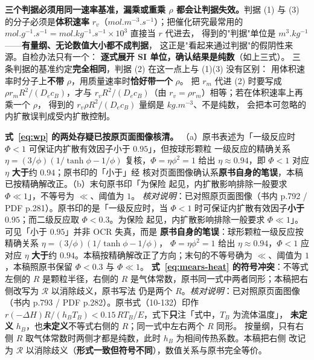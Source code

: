 \begin{pitfall}
\textbf{三个判据必须用同一速率基准，漏乘或重乘 $\rho$ 都会让判据失效。}判据 (1) 与 (3)
的分子必须是\textbf{体积速率} $r_v$（$\unit{mol.m^{-3}.s^{-1}}$）；把催化研究最常用的
$\unit{mol.g^{-1}.s^{-1}}=\unit{mol.kg^{-1}.s^{-1}}\times10^{3}$ 直接当 $r$ 代进去，
得到的"判据"单位是 $\unit{m^3.kg^{-1}}$——\textbf{有量纲、无论数值大小都不成判据}，
这正是"看起来通过判据"的假阴性来源。自检办法只有一个：
\textbf{逐式展开 SI 单位，确认结果是纯数}（如上三式）。
三条判据的基准约定\textbf{完全相同}，判据 (2) 在这一点上与 (1)(3) 没有区别：
用体积速率时分子上\textbf{不带} $\rho$，用质量速率时\textbf{恰好带一个} $\rho$。
把 $r_m$ 代进 (2) 时要写成 $\rho r_mR^{2}/(D_ec_B)$，才与
$r_vR^{2}/(D_ec_B)$（由 $r_v=\rho r_m$）相等；若在体积速率上再乘一个 $\rho$，
得到的 $r_v\rho R^{2}/(D_ec_B)$ 量纲是 $\unit{kg.m^{-3}}$、不是纯数，
会把本可忽略的内扩散误判成受内扩散控制。

\textbf{式~\eqref{eq:wp} 的两处存疑已按原页面图像核清。}
（a）原书表述为「一级反应时 $\Phi<1$ 可保证内扩散有效因子小于 $0.95$」，但按球形颗粒
一级反应的精确关系 $\eta=(3/\phi)(1/\tanh\phi-1/\phi)$ 复核，$\Phi=\eta\phi^{2}=1$ 给出
$\eta\approx 0.94$，即 $\Phi<1$ 对应 $\eta$ \textbf{大于}约 $0.94$；原书印的「小于」经
核对页面图像确认系\textbf{原书自身的笔误}，本稿已按精确解改正。（b）末句原书印「为保险
起见，内扩散影响排除一般要求 $\Phi\ll1$」，不等号为 $\ll$、阈值为 $1$。
\emph{核对说明}：已对照原页面图像（书内 p.792 / PDF p.281）。原书印的是「一级反应时，当
$\Phi<1$ 时可保证内扩散有效因子\textbf{小于} $0.95$；而二级反应取 $\Phi<0.3$。为保险
起见，内扩散影响排除一般要求 $\Phi\ll1$」。可见「小于 $0.95$」并非 OCR 失真，而是
\textbf{原书自身的笔误}：球形颗粒一级反应按精确关系 $\eta=(3/\phi)(1/\tanh\phi-1/\phi)$，
$\Phi=\eta\phi^{2}=1$ 给出 $\eta\approx0.94$，$\Phi<1$ 应对应 $\eta$ \textbf{大于}约
$0.94$。本稿按精确解改正了方向；末句的不等号确为 $\ll$、阈值为 $1$，本稿照原书保留
$\Phi<0.3$ 与 $\Phi\ll1$。
\textbf{式~\eqref{eq:mears-heat} 的符号冲突}：不等式左侧的 $R$ 是颗粒半径，右侧的 $R$
是气体常数，原书同一式中两者同形；本稿把右侧改写为 $\mathscr{R}$ 以消除歧义，原书写法
仍是两个 $R$。\emph{核对说明}：已对照原页面图像（书内 p.793 / PDF p.282）。原书式（10-132）印作
$r(-\Delta H)R/(h_BT_B)<0.15\,RT_B/E$，式下\textbf{只}注「式中，$T_B$ 为流体温度」，
\textbf{未定义} $h_B$，也\textbf{未定义}不等式右侧的 $R$；同一式中左右两个 $R$ 同形。
按量纲，只有右侧 $R$ 取气体常数时两侧才都是纯数，此时 $h_B$ 为相间传热系数。本稿把右侧
改记为 $\mathscr{R}$ 以消除歧义（\textbf{形式一致但符号不同}），数值关系与原书完全等价。
\end{pitfall}

